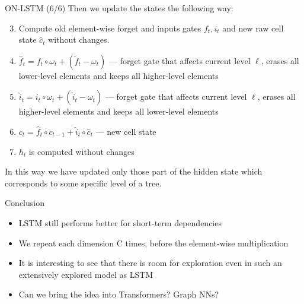 \documentclass[handout, 10pt]{beamer}
\begin{document}
\begin{frame}{ON-LSTM (6/6)}
Then we update the states the following way:
\begin{enumerate}
    \setcounter{enumi}{2}
    \item\pause Compute old element-wise forget and inputs gates $f_t, i_t$ and new raw cell state $\hat{c}_t$ without changes.
    \item\pause $\hat{f}_{t} =f_{t} \circ \omega_{t}+(\tilde{f}_{t}-\omega_{t})$ --- forget gate that affects current level $\ell$, erases all lower-level elements and keeps all higher-level elements
    \item\pause $\hat{i}_{t} =i_{t} \circ \omega_{t}+(\tilde{i}_{t}-\omega_{t})$ --- forget gate that affects current level $\ell$, erases all higher-level elements and keeps all lower-level elements
    \item\pause $c_{t} =\hat{f}_{t} \circ c_{t-1}+\hat{i}_{t} \circ \hat{c}_{t}$ --- new cell state
    \item\pause $h_t$ is computed without changes
\end{enumerate}

In this way we have updated only those part of the hidden state which corresponds to some specific level of a tree.
\end{frame}


\begin{frame}{Conclusion}
    \begin{itemize}
        \item LSTM still performs better for short-term dependencies
        \item We repeat each dimension C times, before the element-wise multiplication    
        \item It is interesting to see that there is room for exploration even in such an extensively explored model as LSTM
        \item Can we bring the idea into Transformers? Graph NNs?
    \end{itemize}
\end{frame}
\end{document}
